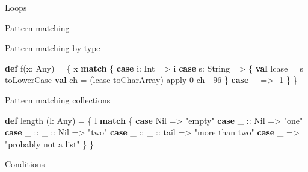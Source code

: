 \documentclass[ignorenonframetext,]{beamer}
\newenvironment{Shaded}{\begin{snugshade}}{\end{snugshade}}
\newcommand{\KeywordTok}[1]{\textcolor[rgb]{0.13,0.29,0.53}{\textbf{#1}}}
\newcommand{\DecValTok}[1]{\textcolor[rgb]{0.00,0.00,0.81}{#1}}
\newcommand{\StringTok}[1]{\textcolor[rgb]{0.31,0.60,0.02}{#1}}
\newcommand{\FunctionTok}[1]{\textcolor[rgb]{0.00,0.00,0.00}{#1}}
\newcommand{\NormalTok}[1]{#1}
\begin{document}
\begin{frame}[fragile]{Loops}
\begin{block}{Pattern matching}
\end{block}

\begin{block}{Pattern matching by type}

\begin{Shaded}
\begin{Highlighting}[]
\KeywordTok{def} \FunctionTok{f}\NormalTok{(x: Any) = \{}
\NormalTok{    x }\KeywordTok{match}\NormalTok{ \{}
        \KeywordTok{case}\NormalTok{ i: Int => i}
        \KeywordTok{case}\NormalTok{ s: String => \{}
            \KeywordTok{val}\NormalTok{ lcase = s toLowerCase}
            \KeywordTok{val}\NormalTok{ ch = (lcase toCharArray) apply }\DecValTok{0}
\NormalTok{            ch - }\DecValTok{96}
\NormalTok{        \}}
        \KeywordTok{case}\NormalTok{ _ => }\DecValTok{-1}
\NormalTok{    \}}
\NormalTok{\}}
\end{Highlighting}
\end{Shaded}

\end{block}

\begin{block}{Pattern matching collections}

\begin{Shaded}
\begin{Highlighting}[]
\KeywordTok{def} \FunctionTok{length}\NormalTok{ (l: Any) = \{}
\NormalTok{    l }\KeywordTok{match}\NormalTok{ \{}
         \KeywordTok{case}\NormalTok{ Nil => }\StringTok{"empty"}
         \KeywordTok{case}\NormalTok{ _ :: Nil => }\StringTok{"one"}
         \KeywordTok{case}\NormalTok{ _ :: _ :: Nil => }\StringTok{"two"}
         \KeywordTok{case}\NormalTok{ _ :: _ :: tail => }\StringTok{"more than two"}
         \KeywordTok{case}\NormalTok{ _ => }\StringTok{"probably not a list"}
\NormalTok{    \}}
\NormalTok{\}}
\end{Highlighting}
\end{Shaded}

\end{block}

\begin{block}{Conditions}


\end{block}
\end{frame}
\end{document}
